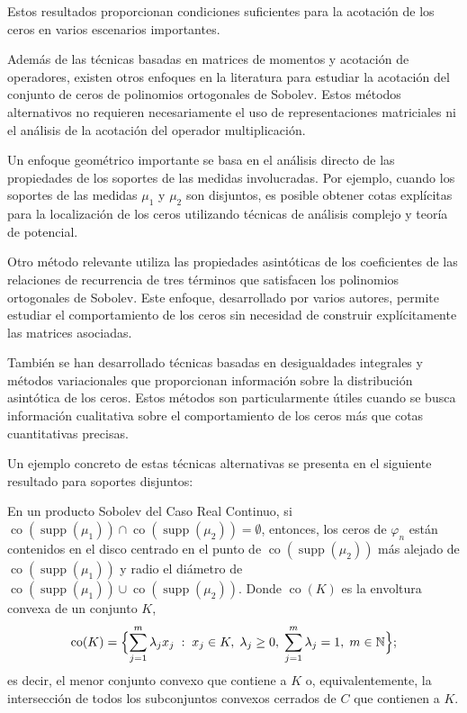 Estos resultados proporcionan condiciones suficientes para la acotación de los ceros en varios escenarios importantes.

Además de las técnicas basadas en matrices de momentos y acotación de operadores, existen otros enfoques en la literatura para estudiar la acotación del conjunto de ceros de polinomios ortogonales de Sobolev. Estos métodos alternativos no requieren necesariamente el uso de representaciones matriciales ni el análisis de la acotación del operador multiplicación.

Un enfoque geométrico importante se basa en el análisis directo de las propiedades de los soportes de las medidas involucradas. Por ejemplo, cuando los soportes de las medidas $\mu_1$ y $\mu_2$ son disjuntos, es posible obtener cotas explícitas para la localización de los ceros utilizando técnicas de análisis complejo y teoría de potencial.

Otro método relevante utiliza las propiedades asintóticas de los coeficientes de las relaciones de recurrencia de tres términos que satisfacen los polinomios ortogonales de Sobolev. Este enfoque, desarrollado por varios autores, permite estudiar el comportamiento de los ceros sin necesidad de construir explícitamente las matrices asociadas.

También se han desarrollado técnicas basadas en desigualdades integrales y métodos variacionales que proporcionan información sobre la distribución asintótica de los ceros. Estos métodos son particularmente útiles cuando se busca información cualitativa sobre el comportamiento de los ceros más que cotas cuantitativas precisas.

Un ejemplo concreto de estas técnicas alternativas se presenta en el siguiente resultado para soportes disjuntos:

\begin{theorem}\label{thm:disjoint_support}
  \cite{lagomasino2001sobolev} En un producto Sobolev del Caso Real Continuo, si $\operatorname{co}(\operatorname{supp}(\mu_1)) \cap \operatorname{co}(\operatorname{supp}(\mu_2)) = \emptyset$, entonces, los ceros de $\varphi_n$ están contenidos en el disco centrado en el punto de $\operatorname{co}(\operatorname{supp}(\mu_2))$ más alejado de $\operatorname{co}(\operatorname{supp}(\mu_1))$ y
  radio el diámetro de $\operatorname{co}(\operatorname{supp}(\mu_1)) \cup \operatorname{co}(\operatorname{supp}(\mu_2))$. Donde $\operatorname{co}(K)$ es la envoltura convexa de un conjunto \(K\),
  \[
    \operatorname{co}(K)=\Bigl\{\sum_{j=1}^m \lambda_j x_j \;:\;
    x_j\in K,\;
    \lambda_j\ge 0,\;
    \sum_{j=1}^m \lambda_j =1,\;
    m\in \mathbb{N}\Bigr\};
  \]
  es decir, el menor conjunto convexo que contiene a \(K\) o, equivalentemente, la intersección de todos los subconjuntos convexos cerrados de \(C\) que contienen a \(K\).
\end{theorem}